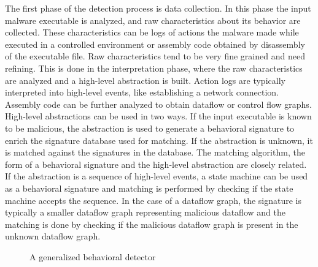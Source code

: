 The first phase of the detection process is data collection. In this phase the input malware executable is analyzed, and raw characteristics about its behavior are collected. These characteristics can be logs of actions the malware made while executed in a controlled environment or assembly code obtained by disassembly of the executable file. Raw characteristics tend to be very fine grained and need refining. This is done in the interpretation phase, where the raw characteristics are analyzed and a high-level abstraction is built. Action logs are typically interpreted into high-level events, like establishing a network connection. Assembly code can be further analyzed to obtain dataflow or control flow graphs. High-level abstractions can be used in two ways. If the input executable is known to be malicious, the abstraction is used to generate a behavioral signature to enrich the signature database used for matching. If the abstraction is unknown, it is matched against the signatures in the database. The matching algorithm, the form of a behavioral signature and the high-level abstraction are closely related. If the abstraction is a sequence of high-level events, a state machine can be used as a behavioral signature and matching is performed by checking if the state machine accepts the sequence. In the case of a dataflow graph, the signature is typically a smaller dataflow graph representing malicious dataflow and the matching is done by checking if the malicious dataflow graph is present in the unknown dataflow graph.

\begin{figure}[H]
    \centering
    \caption{A generalized behavioral detector}
    \label{fig_gen_behav_detector}
\end{figure}

